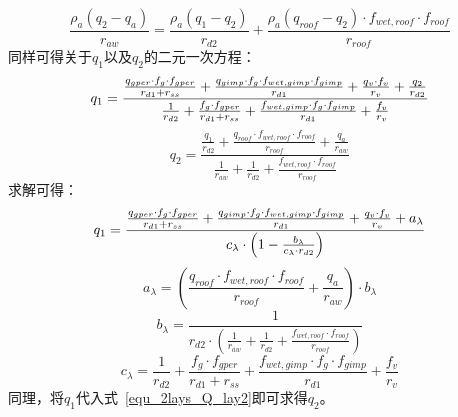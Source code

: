 %
\begin{equation}
    \frac{\rho _a \left( q_{2} - q_a\right)}{r_{aw}} = \frac{\rho _a \left( q_{1} - q_{2}\right)}{r_{d2}} + \frac{\rho _a \left( q_{roof}-q_{2}\right) \cdot f_{wet,roof} \cdot f_{roof}}{r_{roof}}
\end{equation}
同样可得关于$q_{1}$以及$q_{2}$的二元一次方程：
\begin{equation}
    q_{1} = \\
    \frac{\frac{q_{gper} \cdot f_{g} \cdot f_{gper}}{r_{d1} + r_{ss}} + \frac{q_{gimp} \cdot f_{g} \cdot f_{wet,gimp} \cdot f_{gimp}}{r_{d1}} + \frac{q_{v} \cdot f_v}{r_{v}} + \frac{q_{2}}{r_{d2}}}{\frac{1}{r_{d2}} + \frac{f_{g} \cdot f_{gper}}{r_{d1} + r_{ss}} + \frac{f_{wet,gimp} \cdot f_{g} \cdot f_{gimp}}{r_{d1}}+\frac{f_v}{r_{v}}}
\end{equation}
%
\begin{equation}\label{equ_2lays_Q_lay2}
    q_{2} = \frac{\frac{q_{1}}{r_{d2}} + \frac{q_{roof} \cdot f_{wet,roof} \cdot f_{roof}}{r_{roof}} + \frac{q_a}{r_{aw}}}{\frac{1}{r_{aw}} + \frac{1}{r_{d2}} + \frac{f_{wet,roof} \cdot f_{roof}}{r_{roof}}}
\end{equation}
求解可得：
\begin{equation}
    q_{1} = \\
    \frac{\frac{q_{gper} \cdot f_{g} \cdot f_{gper}}{r_{d1}+r_{ss}} + \frac{q_{gimp} \cdot f_{g} \cdot f_{wet,gimp} \cdot f_{gimp}}{r_{d1} } + \frac{q_{v} \cdot f_v}{r_{v}} + a_{\lambda}}{c_{\lambda} \cdot \left( 1 - \frac{b_{\lambda}}{c_{\lambda} \cdot r_{d2}}\right)}
\end{equation}
%
\begin{equation}
    a_{\lambda}= \left(\frac{q_{roof} \cdot f_{wet,roof} \cdot f_{roof}}{r_{roof}} + \frac{q_a}{r_{aw}}\right) \cdot b_{\lambda}
\end{equation}
%
\begin{equation}
    b_{\lambda} = \frac{1}{r_{d2} \cdot \left( \frac{1}{r_{aw}} + \frac{1}{r_{d2}} + \frac{f_{wet,roof} \cdot f_{roof}}{r_{roof}} \right)}
\end{equation}
%
\begin{equation}
    c_{\lambda} = \frac{1}{r_{d2}}+\frac{f_g \cdot f_{gper}}{r_{d1}+r_{ss}} + \frac{f_{wet,gimp} \cdot f_g \cdot f_{gimp}}{r_{d1}} + \frac{f_v}{r_{v}}
\end{equation}
同理，将$q_{1}$代入式~\ref{equ_2lays_Q_lay2}即可求得$q_{2}$。

